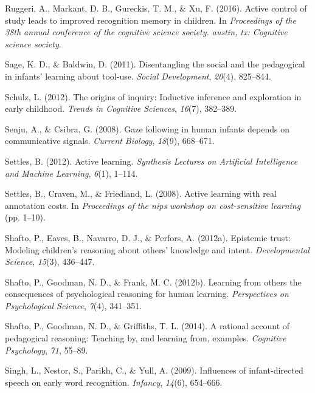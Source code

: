 \documentclass[oneside]{report}
\begin{document}
\hypertarget{ref-ruggeri2016active}{}
Ruggeri, A., Markant, D. B., Gureckis, T. M., \& Xu, F. (2016). Active
control of study leads to improved recognition memory in children. In
\emph{Proceedings of the 38th annual conference of the cognitive science
society. austin, tx: Cognitive science society}.

\hypertarget{ref-sage2011disentangling}{}
Sage, K. D., \& Baldwin, D. (2011). Disentangling the social and the
pedagogical in infants' learning about tool-use. \emph{Social
Development}, \emph{20}(4), 825--844.

\hypertarget{ref-schulz2012origins}{}
Schulz, L. (2012). The origins of inquiry: Inductive inference and
exploration in early childhood. \emph{Trends in Cognitive Sciences},
\emph{16}(7), 382--389.

\hypertarget{ref-senju2008gaze}{}
Senju, A., \& Csibra, G. (2008). Gaze following in human infants depends
on communicative signals. \emph{Current Biology}, \emph{18}(9),
668--671.

\hypertarget{ref-settles2012active}{}
Settles, B. (2012). Active learning. \emph{Synthesis Lectures on
Artificial Intelligence and Machine Learning}, \emph{6}(1), 1--114.

\hypertarget{ref-settles2008active}{}
Settles, B., Craven, M., \& Friedland, L. (2008). Active learning with
real annotation costs. In \emph{Proceedings of the nips workshop on
cost-sensitive learning} (pp. 1--10).

\hypertarget{ref-shafto2012epistemic}{}
Shafto, P., Eaves, B., Navarro, D. J., \& Perfors, A. (2012a). Epistemic
trust: Modeling children's reasoning about others' knowledge and intent.
\emph{Developmental Science}, \emph{15}(3), 436--447.

\hypertarget{ref-shafto2012learning}{}
Shafto, P., Goodman, N. D., \& Frank, M. C. (2012b). Learning from
others the consequences of psychological reasoning for human learning.
\emph{Perspectives on Psychological Science}, \emph{7}(4), 341--351.

\hypertarget{ref-shafto2014rational}{}
Shafto, P., Goodman, N. D., \& Griffiths, T. L. (2014). A rational
account of pedagogical reasoning: Teaching by, and learning from,
examples. \emph{Cognitive Psychology}, \emph{71}, 55--89.

\hypertarget{ref-singh2009influences}{}
Singh, L., Nestor, S., Parikh, C., \& Yull, A. (2009). Influences of
infant-directed speech on early word recognition. \emph{Infancy},
\emph{14}(6), 654--666.
\end{document}
